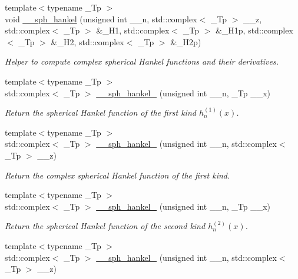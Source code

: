 \begin{DoxyCompactItemize}
\item 
{\footnotesize template$<$typename \+\_\+\+Tp $>$ }\\void \hyperlink{namespacestd_1_1____detail_ae666168f9ede5a09dbae92598b7b14e4}{\+\_\+\+\_\+sph\+\_\+hankel} (unsigned int \+\_\+\+\_\+n, std\+::complex$<$ \+\_\+\+Tp $>$ \+\_\+\+\_\+z, std\+::complex$<$ \+\_\+\+Tp $>$ \&\+\_\+\+H1, std\+::complex$<$ \+\_\+\+Tp $>$ \&\+\_\+\+H1p, std\+::complex$<$ \+\_\+\+Tp $>$ \&\+\_\+\+H2, std\+::complex$<$ \+\_\+\+Tp $>$ \&\+\_\+\+H2p)
\begin{DoxyCompactList}\small\item\em Helper to compute complex spherical Hankel functions and their derivatives. \end{DoxyCompactList}\item 
{\footnotesize template$<$typename \+\_\+\+Tp $>$ }\\std\+::complex$<$ \+\_\+\+Tp $>$ \hyperlink{namespacestd_1_1____detail_adcc174fe4cb03d428f19abcae8012b50}{\+\_\+\+\_\+sph\+\_\+hankel\+\_} (unsigned int \+\_\+\+\_\+n, \+\_\+\+Tp \+\_\+\+\_\+x)
\begin{DoxyCompactList}\small\item\em Return the spherical Hankel function of the first kind $ h^{(1)}_n(x) $. \end{DoxyCompactList}\item 
{\footnotesize template$<$typename \+\_\+\+Tp $>$ }\\std\+::complex$<$ \+\_\+\+Tp $>$ \hyperlink{namespacestd_1_1____detail_a887838c407a7cdb7c4ee145a18d2aa12}{\+\_\+\+\_\+sph\+\_\+hankel\+\_} (unsigned int \+\_\+\+\_\+n, std\+::complex$<$ \+\_\+\+Tp $>$ \+\_\+\+\_\+z)
\begin{DoxyCompactList}\small\item\em Return the complex spherical Hankel function of the first kind. \end{DoxyCompactList}\item 
{\footnotesize template$<$typename \+\_\+\+Tp $>$ }\\std\+::complex$<$ \+\_\+\+Tp $>$ \hyperlink{namespacestd_1_1____detail_a89fe914f377a138d37369d13bda1162e}{\+\_\+\+\_\+sph\+\_\+hankel\+\_} (unsigned int \+\_\+\+\_\+n, \+\_\+\+Tp \+\_\+\+\_\+x)
\begin{DoxyCompactList}\small\item\em Return the spherical Hankel function of the second kind $ h^{(2)}_n(x) $. \end{DoxyCompactList}\item 
{\footnotesize template$<$typename \+\_\+\+Tp $>$ }\\std\+::complex$<$ \+\_\+\+Tp $>$ \hyperlink{namespacestd_1_1____detail_ade83ff0131b8880428cbd58028d89bc5}{\+\_\+\+\_\+sph\+\_\+hankel\+\_} (unsigned int \+\_\+\+\_\+n, std\+::complex$<$ \+\_\+\+Tp $>$ \+\_\+\+\_\+z)

\end{DoxyCompactItemize}
